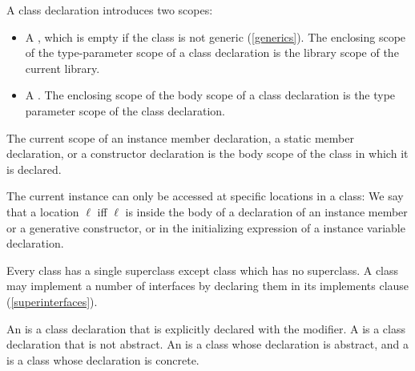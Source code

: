 \documentclass[makeidx]{article}
\begin{document}
\LMHash{}%
A class declaration introduces two scopes:

\begin{itemize}
\item
  A ,
  which is empty if the class is not generic (\ref{generics}).
  The enclosing scope of the type-parameter scope of a class declaration is
  the library scope of the current library.
\item
  A .
  The enclosing scope of the body scope of a class declaration is
  the type parameter scope of the class declaration.
\end{itemize}

\LMHash{}%
The current scope of an instance member declaration,
a static member declaration,
or a constructor declaration is
the body scope of the class in which it is declared.

\LMHash{}%
The current instance
can only be accessed at specific locations in a class:
We say that a location $\ell$
if{}f $\ell$ is inside the body of a declaration of
an instance member or a generative constructor,
or in the initializing expression of a \LATE{} instance variable declaration.


\LMHash{}%
Every class has a single superclass
except class  which has no superclass.
A class may implement a number of interfaces
by declaring them in its implements clause (\ref{superinterfaces}).

\LMHash{}%
An 
is a class declaration that is explicitly declared
with the \ABSTRACT{} modifier.
A 
is a class declaration that is not abstract.
An  is a class
whose declaration is abstract, and
a  is a class
whose declaration is concrete.

\end{document}
